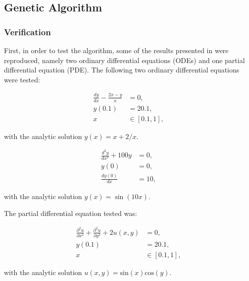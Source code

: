 \documentclass[multicolumn, 9pt]{extarticle}
\begin{document}
\subsection{Genetic Algorithm}
\subsubsection{Verification}
First, in order to test the algorithm, some of the results presented in \cite{Lagaris} were reproduced, namely two ordinary differential equations (ODEs) and one partial differential equation (PDE). The following two ordinary differential equations were tested:

\begin{align*}
	\frac{dy}{dx}  - \frac{2x - y}{x} & = 0,          \\
	y(0.1)                            & = 20.1,       \\
	x                                 & \in [0.1, 1],
\end{align*}

with the analytic solution $y(x) = x + 2/x$.

\begin{equation}
	\begin{aligned}
		\label{eq:ODE}
		\frac{d^{2}y}{dx^{2}}  + 100y & = 0,  \\
		y(0)                          & = 0,  \\
		\frac{dy(0)}{dx}              & = 10,
	\end{aligned}
\end{equation}

with the analytic solution $y(x) = \sin(10x)$.

The partial differential equation tested was:

\begin{equation}
	\begin{aligned}
		\label{eq:PDE}
		\frac{\partial^{2}u}{\partial x^{2}} + \frac{\partial^{2}u}{\partial y^{2}} + 2u(x, y) & = 0,          \\
		y(0.1)                                                                                 & = 20.1,       \\
		x                                                                                      & \in [0.1, 1],
	\end{aligned}
\end{equation}

with the analytic solution $u(x, y) = \text{sin}(x)\text{cos}(y)$.
\end{document}

